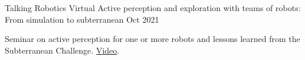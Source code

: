 
\begin{cventries}
  \cventry
  {Talking Robotics}
  {Virtual}
  {Active perception and exploration with teams of robots: From simulation to
  subterranean}
  {Oct 2021}
  {
    \begin{cvitems}
    \item Seminar on active perception for one or more robots and lessons learned
      from the Subterranean Challenge.
      \href{https://youtu.be/KIQkryeUJ6I}{Video}.
    \end{cvitems}
  }
\end{cventries}
